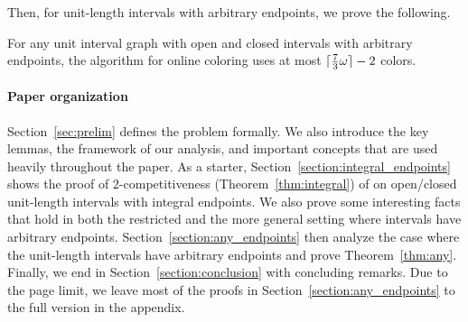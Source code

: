 Then, for unit-length intervals with arbitrary endpoints, we prove the following.
\begin{theorem}
    \label{thm:any}
    For any unit interval graph with open and closed intervals with arbitrary endpoints, the \ff{} algorithm for online coloring uses at most $\lceil \frac{7}{3}\omega \rceil - 2$ colors. 
\end{theorem}

\paragraph*{Paper organization}
Section~\ref{sec:prelim} defines the problem formally. We also introduce the key lemmas, the framework of our analysis, and important concepts that are used heavily throughout the paper.
As a starter, Section~\ref{section:integral_endpoints} shows the proof of $2$-competitiveness (Theorem~\ref{thm:integral}) of \ff on open/closed unit-length intervals with integral endpoints.
We also prove some interesting facts that hold in both the restricted and the more general setting where intervals have arbitrary endpoints.
Section~\ref{section:any_endpoints} then analyze the case where the unit-length intervals have arbitrary endpoints and prove Theorem~\ref{thm:any}.
Finally, we end in Section~\ref{section:conclusion} with concluding remarks.
Due to the page limit, we leave most of the proofs in Section~\ref{section:any_endpoints} to the full version in the appendix.